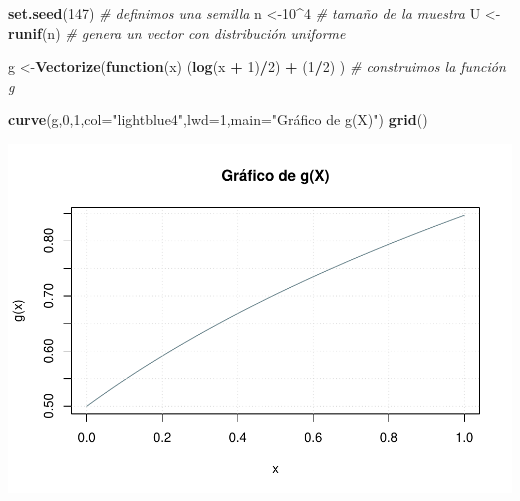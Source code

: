 \documentclass[
]{article}
\newenvironment{Shaded}{\begin{snugshade}}{\end{snugshade}}
\newcommand{\AttributeTok}[1]{\textcolor[rgb]{0.13,0.29,0.53}{#1}}
\newcommand{\CommentTok}[1]{\textcolor[rgb]{0.56,0.35,0.01}{\textit{#1}}}
\newcommand{\ControlFlowTok}[1]{\textcolor[rgb]{0.13,0.29,0.53}{\textbf{#1}}}
\newcommand{\DecValTok}[1]{\textcolor[rgb]{0.00,0.00,0.81}{#1}}
\newcommand{\FunctionTok}[1]{\textcolor[rgb]{0.13,0.29,0.53}{\textbf{#1}}}
\newcommand{\NormalTok}[1]{#1}
\newcommand{\OtherTok}[1]{\textcolor[rgb]{0.56,0.35,0.01}{#1}}
\newcommand{\SpecialCharTok}[1]{\textcolor[rgb]{0.81,0.36,0.00}{\textbf{#1}}}
\newcommand{\StringTok}[1]{\textcolor[rgb]{0.31,0.60,0.02}{#1}}
\begin{document}
\begin{Shaded}
\begin{Highlighting}[]
\FunctionTok{set.seed}\NormalTok{(}\DecValTok{147}\NormalTok{) }\CommentTok{\# definimos una semilla}
\NormalTok{n }\OtherTok{\textless{}{-}}\DecValTok{10}\SpecialCharTok{\^{}}\DecValTok{4} \CommentTok{\# tamaño de la muestra}
\NormalTok{U }\OtherTok{\textless{}{-}}\FunctionTok{runif}\NormalTok{(n) }\CommentTok{\# genera un vector con distribución uniforme}

\NormalTok{g }\OtherTok{\textless{}{-}}\FunctionTok{Vectorize}\NormalTok{(}\ControlFlowTok{function}\NormalTok{(x) (}\FunctionTok{log}\NormalTok{(x }\SpecialCharTok{+} \DecValTok{1}\NormalTok{)}\SpecialCharTok{/}\DecValTok{2}\NormalTok{) }\SpecialCharTok{+}\NormalTok{ (}\DecValTok{1}\SpecialCharTok{/}\DecValTok{2}\NormalTok{) ) }\CommentTok{\# construimos la función g }

\FunctionTok{curve}\NormalTok{(g,}\DecValTok{0}\NormalTok{,}\DecValTok{1}\NormalTok{,}\AttributeTok{col=}\StringTok{"lightblue4"}\NormalTok{,}\AttributeTok{lwd=}\DecValTok{1}\NormalTok{,}\AttributeTok{main=}\StringTok{"Gráfico de g(X)"}\NormalTok{)}
\FunctionTok{grid}\NormalTok{()  }
\end{Highlighting}
\end{Shaded}

\includegraphics{tarea2_files/figure-latex/unnamed-chunk-2-1.pdf}
\end{document}
